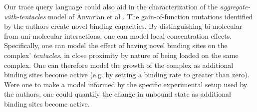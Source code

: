 Our trace query language could also aid in the characterization of the \emph{aggregate-with-tentacles} model of Anvarian et al \cite{anvarian2016axin}. The gain-of-function mutations identified by the authors create novel binding capacities. By distinguishing bi-molecular from uni-molecular interactions, one can model local concentration effects. Specifically, one can model the effect of having novel binding sites on the complex' \emph{tentacles}, in close proximity by nature of being loaded on the same complex. One can therefore model the growth of the complex as additional binding sites become active (e.g. by setting a binding rate to greater than zero). Were one to make a model informed by the specific experimental setup used by the authors, one could quantify the change in unbound state as additional binding sites become active.